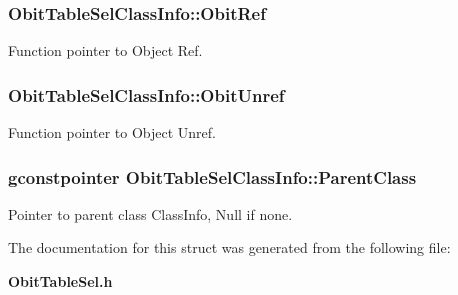 \subsubsection{ {\bf Obit\-Table\-Sel\-Class\-Info::Obit\-Ref}}\label{structObitTableSelClassInfo_o10}


Function pointer to Object Ref. 

\subsubsection{ {\bf Obit\-Table\-Sel\-Class\-Info::Obit\-Unref}}\label{structObitTableSelClassInfo_o11}


Function pointer to Object Unref. 

\subsubsection{\setlength{\rightskip}{0pt plus 5cm}gconstpointer {\bf Obit\-Table\-Sel\-Class\-Info::Parent\-Class}}\label{structObitTableSelClassInfo_o3}


Pointer to parent class Class\-Info, Null if none. 



The documentation for this struct was generated from the following file:\begin{CompactItemize}
\item 
{\bf Obit\-Table\-Sel.h}\end{CompactItemize}
